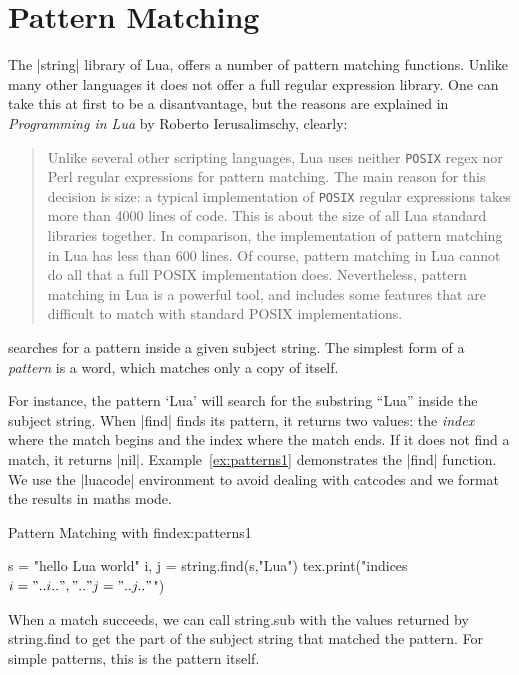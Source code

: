\def\luacmd#1{\textbf{#1}}

\chapter{Pattern Matching}

The |string| library of Lua, offers a number of pattern matching functions. Unlike many other languages it does not offer a full regular expression library. One can take this at first to be a disantvantage, but the reasons are explained in \textit{Programming in Lua} by Roberto Ierusalimschy, clearly:

\begin{quote}
Unlike several other scripting languages, Lua uses neither \texttt{POSIX} regex nor
Perl regular expressions for pattern matching. The main reason for this decision
is size: a typical implementation of \texttt{POSIX} regular expressions takes more than
4000 lines of code. This is about the size of all Lua standard libraries together.
In comparison, the implementation of pattern matching in Lua has less than
600 lines. Of course, pattern matching in Lua cannot do all that a full POSIX
implementation does. Nevertheless, pattern matching in Lua is a powerful tool,
and includes some features that are difficult to match with standard POSIX
implementations.
\end{quote}

searches for a pattern inside a given subject string. The simplest form of a \textit{pattern} is a word, which matches only a copy of itself.

For instance, the pattern ‘Lua’ will search for the substring “Lua” inside the
subject string. When |find| finds its pattern, it returns two values: the \textit{index} where the match begins and the index where the match ends. If it does not find a match, it returns |nil|. Example~\ref{ex:patterns1} demonstrates the |find| function. We use the |luacode| environment to avoid dealing with catcodes and we format the results in maths mode.

\begin{texexample}{Pattern Matching with find}{ex:patterns1}
\begin{luacode*}
s = "hello Lua world"
i, j = string.find(s,"Lua")
tex.print("indices $i="..i..",".."j="..j.."$")
\end{luacode*}
\end{texexample}

When a match succeeds, we can call string.sub with the values returned by
string.find to get the part of the subject string that matched the pattern. For
simple patterns, this is the pattern itself.

